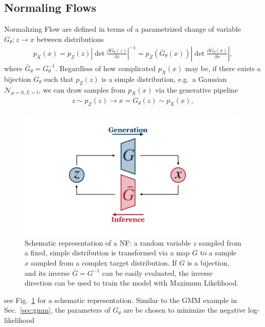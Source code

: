 \subsection{Normaling Flows}\label{intro:normflow}
Normalizing Flow  are defined in terms of a parametrized change of variable $G_{\theta}: z \rightarrow x$ between distributions
%
\begin{align}\label{eq:nf}
p_X(x) = p_Z(z) \left|\det \frac{\partial G_{\theta}(z)}{\partial z}\right|^{-1} = p_Z(\bar{G}_{\theta}(x)) \left|\det \frac{\partial \bar{G}_{\theta}(x)}{\partial x}\right|,
\end{align}
%
where $\bar{G}_{\theta} = G^{-1}_{\theta}$.
Regardless of how complicated $p_{X}(x)$ may be, if there exists a bijection $G_{\theta}$ such that $p_Z(z)$ is a simple distribution, e.g.\ a Gaussian $\mathcal{N}_{\mu=0, \Sigma=\mathbb{I}}$, we can draw samples from $p_{X}(x)$ via the generative pipeline
%
\begin{align}
z \sim p_Z(z) \longrightarrow x = G_{\theta}(z)  \sim p_{X}(x),
\end{align}
%
%
\begin{figure}[t]
\centering
\includegraphics[page = 1, width=0.99\textwidth]{./figures/inn}
\caption{Schematic representation of a NF: a random variable $z$ sampled from a fixed, simple distribution is transformed via a map $G$ to a sample $x$ sampled from a complex target distribution. If $G$ is a bijection, and its inverse $\bar{G} = G^{-1}$ can be easily evaluated, the inverse direction can be used to train the model with Maximum Likelihood.}
\label{fig:NF}
\end{figure}
%
see Fig.~\ref{fig:NF} for a schematic representation. Similar to the GMM example in Sec.~\ref{sec:gmm}, the parameters of $G_{\theta}$ are be chosen to minimize the negative log-likelihood
